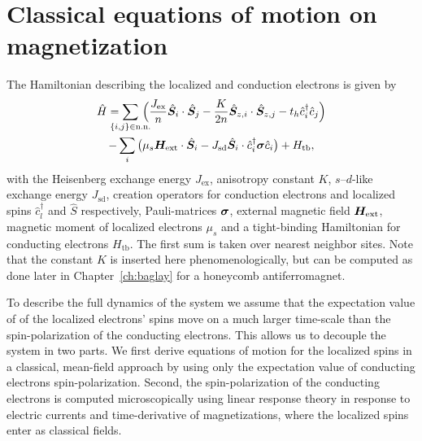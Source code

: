 \section{Classical equations of motion on magnetization}\label{cd:sd:motion}
The Hamiltonian describing the localized and conduction electrons is given by
\begin{multline}
    \hat{H}
        = \sum_{\mathclap{\{i,j\}\in\text{n.n.}}}\,\Big(\frac{J_{\text{ex}}}{n}\hat{\bb{S}}_i\cdot\hat{\bb{S}}_j - \frac{K}{2n}\hat{\bb{S}}_{z,i}\cdot\hat{\bb{S}}_{z,j}-t_h \hat{c}_i^\dagger\hat{c}_j
        \Big)\\-\sum_i \big(\mu_s\bb{H}_\text{ext}\cdot\hat{\bb{S}}_i-J_\text{sd}\hat{\bb{S}}_i\cdot\hat{c}_i^\dagger\bb{\sigma}\hat{c}_i\big)+H_\text{tb},
    \label{intro:eq:Hm}%
\end{multline}
with the Heisenberg exchange energy $J_{\text{ex}}$, anisotropy constant $K$, $s$--$d$-like exchange energy $J_{\text{sd}}$, creation operators for conduction electrons and localized spins $\hat{c}^\dagger_l$ and $\hat{S}$ respectively, Pauli-matrices $\boldsymbol{\sigma}$, external magnetic field $\boldsymbol{H}_\text{ext}$, magnetic moment of localized electrons $\mu_s$ and a tight-binding Hamiltonian for conducting electrons $H_\text{tb}$.  The first sum is taken over nearest neighbor sites. Note that the constant $K$ is inserted here phenomenologically, but can be computed as done later in Chapter~\ref{ch:baglay} for a honeycomb antiferromagnet.

To describe the full dynamics of the system we assume that the expectation value of of the localized electrons' spins move on a much larger time-scale than the spin-polarization of the conducting electrons. This allows us to decouple the system in two parts. We first derive equations of motion for the localized spins in a classical, mean-field approach by using only the expectation value of conducting electrons spin-polarization. Second, the spin-polarization of the conducting electrons is computed microscopically using linear response theory in response to electric currents and time-derivative of magnetizations, where the localized spins enter as classical fields. 

